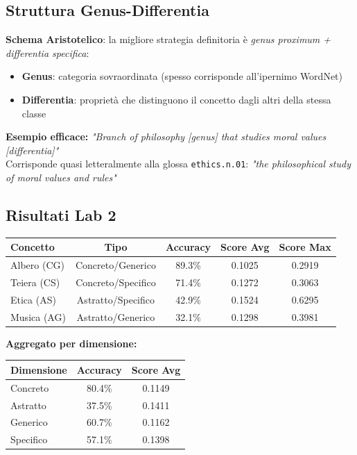 \documentclass[12pt,a4paper]{article}
\begin{document}
\subsection{Struttura Genus-Differentia}

\begin{defbox}
\textbf{Schema Aristotelico}: la migliore strategia definitoria \`e \emph{genus proximum + differentia specifica}:
\begin{itemize}
  \item \textbf{Genus}: categoria sovraordinata (spesso corrisponde all'ipernimo WordNet)
  \item \textbf{Differentia}: propriet\`a che distinguono il concetto dagli altri della stessa classe
\end{itemize}
\textbf{Esempio efficace:} \textit{"Branch of philosophy [genus] that studies moral values [differentia]"}\\
Corrisponde quasi letteralmente alla glossa \texttt{ethics.n.01}: \textit{"the philosophical study of moral values and rules"}
\end{defbox}

\subsection{Risultati Lab 2}

\begin{resultbox}
\begin{center}
\begin{tabular}{lcccc}
\toprule
\textbf{Concetto} & \textbf{Tipo} & \textbf{Accuracy} & \textbf{Score Avg} & \textbf{Score Max} \\
\midrule
Albero (CG)  & Concreto/Generico  & 89.3\% & 0.1025 & 0.2919 \\
Teiera (CS)  & Concreto/Specifico & 71.4\% & 0.1272 & 0.3063 \\
Etica (AS)   & Astratto/Specifico & 42.9\% & 0.1524 & 0.6295 \\
Musica (AG)  & Astratto/Generico  & 32.1\% & 0.1298 & 0.3981 \\
\bottomrule
\end{tabular}
\end{center}

\bigskip
\textbf{Aggregato per dimensione:}
\begin{center}
\begin{tabular}{lcc}
\toprule
\textbf{Dimensione} & \textbf{Accuracy} & \textbf{Score Avg} \\
\midrule
Concreto & 80.4\% & 0.1149 \\
Astratto & 37.5\% & 0.1411 \\
Generico & 60.7\% & 0.1162 \\
Specifico & 57.1\% & 0.1398 \\
\bottomrule
\end{tabular}
\end{center}
\end{resultbox}
\end{document}
